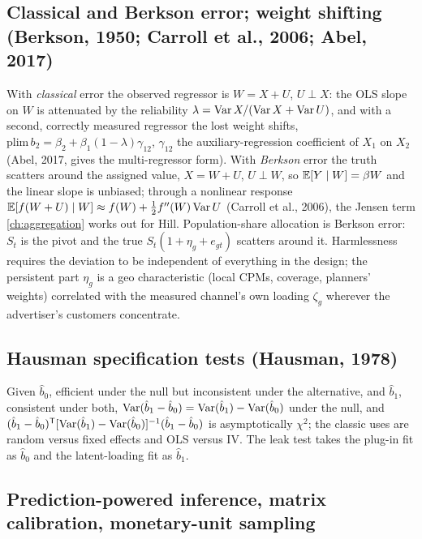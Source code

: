 \subsection{Classical and Berkson error; weight shifting (Berkson, 1950; Carroll et al., 2006; Abel, 2017)}

With \emph{classical} error the observed regressor is $W = X + U$, $U \perp X$: the OLS slope on $W$ is attenuated by the reliability $\lambda = \operatorname{Var} X/(\operatorname{Var} X + \operatorname{Var} U)$, and with a second, correctly measured regressor the lost weight shifts, $\mathrm{plim}\,b_2 = \beta_2 + \beta_1(1-\lambda)\gamma_{12}$, $\gamma_{12}$ the auxiliary-regression coefficient of $X_1$ on $X_2$ (Abel, 2017, gives the multi-regressor form). With \emph{Berkson} error the truth scatters around the assigned value, $X = W + U$, $U \perp W$, so $\mathbb{E}[Y \mid W] = \beta W$ and the linear slope is unbiased; through a nonlinear response $\mathbb{E}[f(W+U) \mid W] \approx f(W) + \tfrac12 f''(W)\operatorname{Var} U$ (Carroll et al., 2006), the Jensen term \cref{ch:aggregation} works out for Hill. Population-share allocation is Berkson error: $S_t$ is the pivot and the true $S_t(1+\eta_g+e_{gt})$ scatters around it. Harmlessness requires the deviation to be independent of everything in the design; the persistent part $\eta_g$ is a geo characteristic (local CPMs, coverage, planners' weights) correlated with the measured channel's own loading $\zeta_g$ wherever the advertiser's customers concentrate.

\subsection{Hausman specification tests (Hausman, 1978)}

Given $\hat b_0$, efficient under the null but inconsistent under the alternative, and $\hat b_1$, consistent under both, $\operatorname{Var}(\hat b_1 - \hat b_0) = \operatorname{Var}(\hat b_1) - \operatorname{Var}(\hat b_0)$ under the null, and $(\hat b_1 - \hat b_0)^{\mathsf{T}}[\operatorname{Var}(\hat b_1)-\operatorname{Var}(\hat b_0)]^{-1}(\hat b_1 - \hat b_0)$ is asymptotically $\chi^2$; the classic uses are random versus fixed effects and OLS versus IV. The leak test takes the plug-in fit as $\hat b_0$ and the latent-loading fit as $\hat b_1$.

\subsection{Prediction-powered inference, matrix calibration, monetary-unit sampling}

